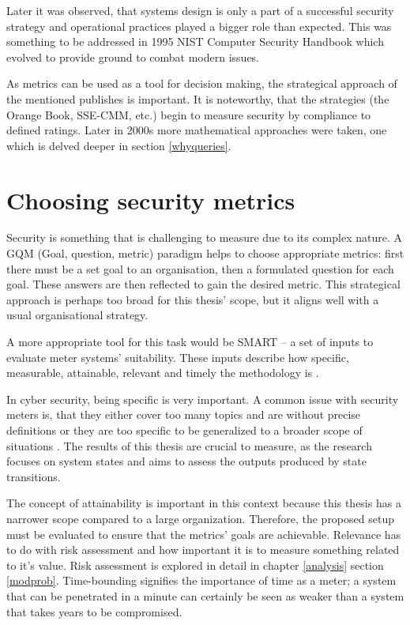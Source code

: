 Later it was observed, that systems design is only a part of a
successful security strategy and operational practices played a
bigger role than expected. This was something to be addressed in 1995 NIST
Computer Security Handbook which evolved to provide ground to
combat modern issues. \cite{bayuk2013measuring}

As metrics can be used as a tool for decision making, the strategical
approach of the mentioned publishes is important. It is noteworthy, that
the strategies (the Orange Book, SSE-CMM, etc.) begin to measure
security by compliance to defined ratings. Later in 2000s more
mathematical approaches were taken, one which is delved deeper in
section \ref{whyqueries}. \cite{bayuk2013measuring}

\section{Choosing security metrics} \label{choosingsecmet}

Security is something that is challenging to measure due to its
complex nature. A GQM (Goal, question, metric) paradigm helps to
choose appropriate metrics: first there must be a set goal to an
organisation, then a formulated question for each goal. These answers
are then reflected to gain the desired metric. This strategical
approach is perhaps too broad for this thesis' scope, but it aligns well
with a usual organisational strategy. \cite{papazov2019cybersecurity}

A more appropriate tool for this task would be SMART – a set of inputs
to evaluate meter systems' suitability. These inputs describe how
specific, measurable, attainable, relevant and timely the methodology
is \cite{payne2006guide}.

In cyber security, being specific is very important. A common issue
with security meters is, that they either cover too many topics and
are without precise definitions or they are too specific to be
generalized to a broader scope of situations
\cite{wang2005information}. The results of this thesis are crucial to
measure, as the research focuses on system states and aims to assess
the outputs produced by state transitions.

The concept of attainability is important in this context because this
thesis has a narrower scope compared to a large
organization. Therefore, the proposed setup must be evaluated to
ensure that the metrics' goals are achievable. Relevance has to do
with risk assessment and how important it is to measure something related
to it's value. Risk assessment is explored in detail  in chapter
\ref{analysis} section \ref{modprob}. Time-bounding signifies the
importance of time as a meter; a system that can be penetrated in a
minute can certainly be seen as weaker than a system that takes years
to be compromised.

